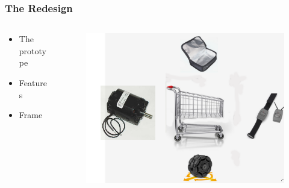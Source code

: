 \documentclass[12pt]{beamer}
\begin{document}
\begin{frame}


  \frametitle{The Redesign }
 
	\begin{columns}
       \begin{column}{4cm}
       \vspace{-3cm}
            \begin{itemize}
	
     \item The prototype
      \item Features
     \item Frame
    \end{itemize}
         
        \end{column}
    
    
 \begin{column}{7cm}
       \vspace{-1cm}
           \begin{figure}
               \includegraphics[scale=0.3]{images/design.png}
               
            \end{figure}
        \end{column}
    \end{columns}
\end{frame}
 
\end{document}
